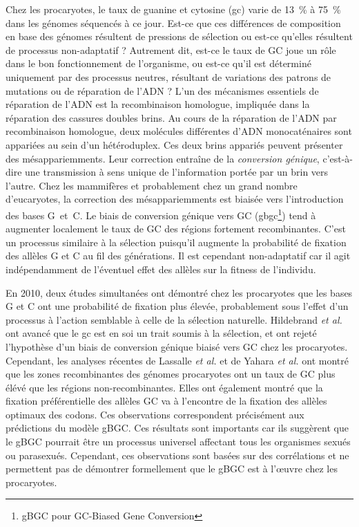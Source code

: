 Chez les procaryotes, le taux de guanine et cytosine (\ac{gc}) varie de
\SI{13}{\percent} à \SI{75}{\percent} dans les génomes séquencés à ce
jour\cite{reddy_genomes_2015}. Est-ce que ces différences de composition en base
des génomes résultent de pressions de sélection ou est-ce qu'elles résultent de
processus non-adaptatif ? Autrement dit, est-ce le taux de GC joue un rôle dans
le bon fonctionnement de l'organisme, ou est-ce qu'il est déterminé uniquement
par des processus neutres, résultant de variations des patrons de mutations ou
de réparation de l'ADN ? L'un des mécanismes essentiels de réparation de l'ADN
est la recombinaison homologue, impliquée dans la réparation des cassures
doubles brins. Au cours de la réparation de l'ADN par recombinaison homologue,
deux molécules différentes d'ADN monocaténaires sont appariées au sein d'un
hétéroduplex. Ces deux brins appariés peuvent présenter des mésappariemments.
Leur correction entraîne de la \emph{conversion génique}\cite{chen_gene_2007},
c'est-à-dire une transmission à sens unique de l'information portée par un brin
vers l'autre. Chez les mammifères et probablement chez un grand nombre
d'eucaryotes, la correction des mésappariemments est biaisée vers l'introduction
des bases G~et~C\cite{pessia_evidence_2012}. Le biais de conversion génique vers
GC (\ac{gbgc}\footnote{gBGC pour GC-Biased Gene Conversion}) tend à augmenter
localement le taux de GC des régions fortement
recombinantes\cite{duret_biased_2009,lesecque_gc-biased_2013,williams_non-crossover_2015}.
C'est un processus similaire à la sélection puisqu'il augmente la probabilité de
fixation des allèles G et C au fil des générations. Il est cependant
non-adaptatif car il agit indépendamment de l'éventuel effet des allèles sur la
fitness de l'individu.

En 2010, deux études simultanées\cite{hildebrand_evidence_2010,
  hershberg_evidence_2010} ont démontré chez les procaryotes que les bases G et C
ont une probabilité de fixation plus élevée, probablement sous l'effet d'un
processus à l'action semblable à celle de la sélection naturelle. Hildebrand
\emph{et al.} ont avancé que le \ac{gc} est en soi un trait soumis à la
sélection, et ont rejeté l'hypothèse d'un biais de conversion génique biaisé
vers GC chez les procaryotes. Cependant, les analyses récentes de Lassalle
\emph{et al.} \cite{lassalle_gc-content_2015} et de Yahara \emph{et
  al.}\cite{yahara_landscape_2016} ont montré que les zones recombinantes des
génomes procaryotes ont un taux de GC plus élévé que les régions
non-recombinantes. Elles ont également montré que la fixation préférentielle des
allèles GC va à l'encontre de la fixation des allèles optimaux des codons. Ces
observations correspondent précisément aux prédictions du modèle gBGC. Ces
résultats sont importants car ils suggèrent que le gBGC pourrait être un
processus universel affectant tous les organismes sexués ou parasexués.
Cependant, ces observations sont basées sur des corrélations et ne permettent
pas de démontrer formellement que le gBGC est à l'œuvre chez les procaryotes.

